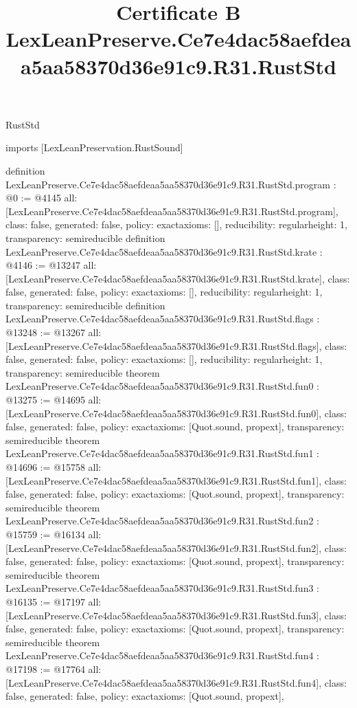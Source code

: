 \begin{lexlean}{RustStd}
\title{Certificate B LexLeanPreserve.Ce7e4dac58aefdeaa5aa58370d36e91c9.R31.RustStd}
\begin{coremodule}
imports [LexLeanPreservation.RustSound]

definition LexLeanPreserve.Ce7e4dac58aefdeaa5aa58370d36e91c9.R31.RustStd.program : @0 := @4145 {
  all: [LexLeanPreserve.Ce7e4dac58aefdeaa5aa58370d36e91c9.R31.RustStd.program],
  class: false,
  generated: false,
  policy: exact{axioms: []},
  reducibility: regular{height: 1},
  transparency: semireducible
}
definition LexLeanPreserve.Ce7e4dac58aefdeaa5aa58370d36e91c9.R31.RustStd.krate : @4146 := @13247 {
  all: [LexLeanPreserve.Ce7e4dac58aefdeaa5aa58370d36e91c9.R31.RustStd.krate],
  class: false,
  generated: false,
  policy: exact{axioms: []},
  reducibility: regular{height: 1},
  transparency: semireducible
}
definition LexLeanPreserve.Ce7e4dac58aefdeaa5aa58370d36e91c9.R31.RustStd.flags : @13248 := @13267 {
  all: [LexLeanPreserve.Ce7e4dac58aefdeaa5aa58370d36e91c9.R31.RustStd.flags],
  class: false,
  generated: false,
  policy: exact{axioms: []},
  reducibility: regular{height: 1},
  transparency: semireducible
}
theorem LexLeanPreserve.Ce7e4dac58aefdeaa5aa58370d36e91c9.R31.RustStd.fun0 : @13275 := @14695 {
  all: [LexLeanPreserve.Ce7e4dac58aefdeaa5aa58370d36e91c9.R31.RustStd.fun0],
  class: false,
  generated: false,
  policy: exact{axioms: [Quot.sound, propext]},
  transparency: semireducible
}
theorem LexLeanPreserve.Ce7e4dac58aefdeaa5aa58370d36e91c9.R31.RustStd.fun1 : @14696 := @15758 {
  all: [LexLeanPreserve.Ce7e4dac58aefdeaa5aa58370d36e91c9.R31.RustStd.fun1],
  class: false,
  generated: false,
  policy: exact{axioms: [Quot.sound, propext]},
  transparency: semireducible
}
theorem LexLeanPreserve.Ce7e4dac58aefdeaa5aa58370d36e91c9.R31.RustStd.fun2 : @15759 := @16134 {
  all: [LexLeanPreserve.Ce7e4dac58aefdeaa5aa58370d36e91c9.R31.RustStd.fun2],
  class: false,
  generated: false,
  policy: exact{axioms: [Quot.sound, propext]},
  transparency: semireducible
}
theorem LexLeanPreserve.Ce7e4dac58aefdeaa5aa58370d36e91c9.R31.RustStd.fun3 : @16135 := @17197 {
  all: [LexLeanPreserve.Ce7e4dac58aefdeaa5aa58370d36e91c9.R31.RustStd.fun3],
  class: false,
  generated: false,
  policy: exact{axioms: [Quot.sound, propext]},
  transparency: semireducible
}
theorem LexLeanPreserve.Ce7e4dac58aefdeaa5aa58370d36e91c9.R31.RustStd.fun4 : @17198 := @17764 {
  all: [LexLeanPreserve.Ce7e4dac58aefdeaa5aa58370d36e91c9.R31.RustStd.fun4],
  class: false,
  generated: false,
  policy: exact{axioms: [Quot.sound, propext]},
}
\end{coremodule}
\end{lexlean}
